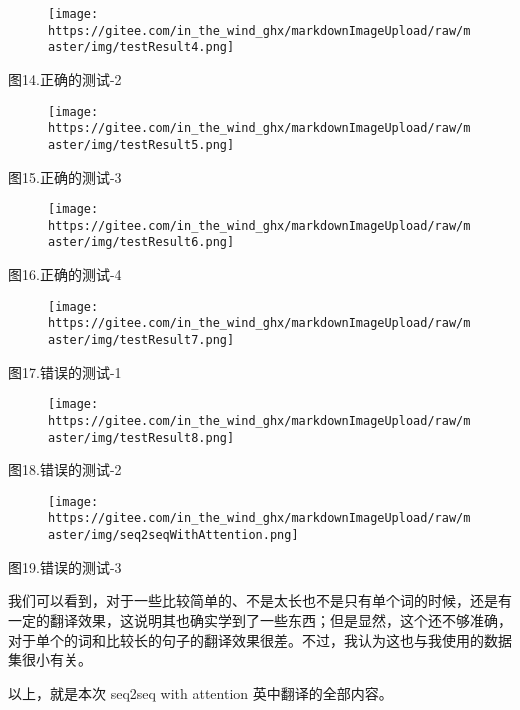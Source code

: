 \documentclass[
]{article}
\begin{document}
\begin{figure}
\centering
\texttt{[image: https://gitee.com/in\_the\_wind\_ghx/markdownImageUpload/raw/master/img/testResult4.png]}
\caption{}
\end{figure}

图14.正确的测试-2

\begin{figure}
\centering
\texttt{[image: https://gitee.com/in\_the\_wind\_ghx/markdownImageUpload/raw/master/img/testResult5.png]}
\caption{}
\end{figure}

图15.正确的测试-3

\begin{figure}
\centering
\texttt{[image: https://gitee.com/in\_the\_wind\_ghx/markdownImageUpload/raw/master/img/testResult6.png]}
\caption{}
\end{figure}

图16.正确的测试-4

\begin{figure}
\centering
\texttt{[image: https://gitee.com/in\_the\_wind\_ghx/markdownImageUpload/raw/master/img/testResult7.png]}
\caption{}
\end{figure}

图17.错误的测试-1

\begin{figure}
\centering
\texttt{[image: https://gitee.com/in\_the\_wind\_ghx/markdownImageUpload/raw/master/img/testResult8.png]}
\caption{}
\end{figure}

图18.错误的测试-2

\begin{figure}
\centering
\texttt{[image: https://gitee.com/in\_the\_wind\_ghx/markdownImageUpload/raw/master/img/seq2seqWithAttention.png]}
\caption{}
\end{figure}

图19.错误的测试-3

我们可以看到，对于一些比较简单的、不是太长也不是只有单个词的时候，还是有一定的翻译效果，这说明其也确实学到了一些东西；但是显然，这个还不够准确，对于单个的词和比较长的句子的翻译效果很差。不过，我认为这也与我使用的数据集很小有关。

以上，就是本次 seq2seq with attention 英中翻译的全部内容。
\end{document}
